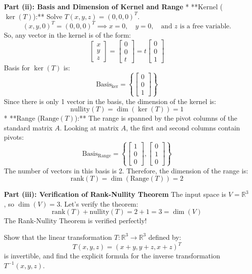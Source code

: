 \documentclass[11pt,a4paper]{article}
\begin{document}
\begin{solutionbox}
\textbf{Part (ii): Basis and Dimension of Kernel and Range}
* **Kernel ($\ker(T)$):** Solve $T(x, y, z) = (0, 0, 0)^T$.
  \[ (x, y, 0)^T = (0, 0, 0)^T \implies x = 0, \quad y = 0, \quad \text{and } z \text{ is a free variable}. \]
  So, any vector in the kernel is of the form:
  \[ \begin{bmatrix} x \\ y \\ z \end{bmatrix} = \begin{bmatrix} 0 \\ 0 \\ t \end{bmatrix} = t \begin{bmatrix} 0 \\ 0 \\ 1 \end{bmatrix} \]
  Basis for $\ker(T)$ is:
  \[ \text{Basis}_{\ker} = \left\{ \begin{bmatrix} 0 \\ 0 \\ 1 \end{bmatrix} \right\} \]
  Since there is only 1 vector in the basis, the dimension of the kernel is:
  \[ \text{nullity}(T) = \dim(\ker(T)) = 1 \]
* **Range ($\text{Range}(T)$):** The range is spanned by the pivot columns of the standard matrix $A$.
  Looking at matrix $A$, the first and second columns contain pivots:
  \[ \text{Basis}_{\text{Range}} = \left\{ \begin{bmatrix} 1 \\ 0 \\ 0 \end{bmatrix}, \begin{bmatrix} 0 \\ 1 \\ 0 \end{bmatrix} \right\} \]
  The number of vectors in this basis is 2. Therefore, the dimension of the range is:
  \[ \text{rank}(T) = \dim(\text{Range}(T)) = 2 \]

\textbf{Part (iii): Verification of Rank-Nullity Theorem}
The input space is $V = \mathbb{R}^3$, so $\dim(V) = 3$.
Let's verify the theorem:
\[ \text{rank}(T) + \text{nullity}(T) = 2 + 1 = 3 = \dim(V) \]
The Rank-Nullity Theorem is verified perfectly!
\end{solutionbox}

\vspace{0.8cm}

\begin{questionbox}
Show that the linear transformation $T: \mathbb{R}^3 \to \mathbb{R}^3$ defined by:
\[ T(x, y, z) = (x + y, y + z, x + z)^T \]
is invertible, and find the explicit formula for the inverse transformation $T^{-1}(x, y, z)$.
\end{questionbox}
\end{document}
